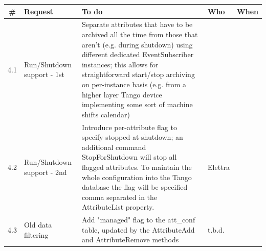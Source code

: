 \documentclass[11pt,a4paper]{article}
\begin{document}
\begin{longtable}{|c|p{6.0cm}|p{6.0cm}|p{1.0cm}|p{1.4cm}|}
	\hline
	\bf{\#} & \bf{Request} & \bf{To do} & \bf{Who} & \bf{When} \\
	\hline
	\endhead
	4.1 &
	Run/Shutdown support - 1st &
	Separate attributes that have to be archived all the time from
	those that aren't (e.g. during shutdown) using different dedicated 
	EventSubscriber instances; this allows for straightforward
	start/stop archiving on per-instance basis (e.g. from a higher layer
	Tango device implementing some sort of machine shifts calendar) &
	&
	\\
	\hline
	4.2 &
	Run/Shutdown support  - 2nd&
	Introduce per-attribute flag to specify stopped-at-shutdown; an
	additional command StopForShutdown will stop all flagged attributes.
	To maintain the whole configuration into the Tango database the
	flag will be specified comma separated in the AttributeList property. &
	Elettra &
	\\
	\hline
	4.3 &
	Old data filtering &
	Add "managed" flag to the att\_conf table, updated by the AttributeAdd and
	AttributeRemove methods &
	t.b.d. &
	\\
	\hline
\end{longtable}
\end{document}
